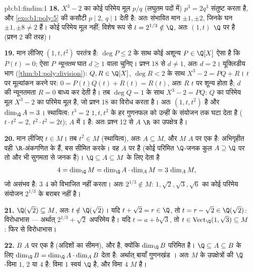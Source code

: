 \begin{solution}{pb:b1:findim:1}
\textbf{18.} $X^3 - 2$ का कोई परिमेय मूल $p/q$ (लघुतम पदों में) $p^3 = 2q^3$
संतुष्ट करता है, और \cref{exo:b1:poly:5} की कसौटी $p \mid 2$, $q \mid 1$
देती है: अतः संभावित मान $\pm1, \pm2$, जिनके घन $\pm1, \pm8 \neq 2$ हैं। कोई
परिमेय मूल नहीं; विशेष रूप से $t = 2^{1/3} \notin \Q$, अतः $(1, t)$ $\Q$ पर
 है (प्रश्न 2 की तरह)।

\textbf{19.} मान लीजिए $(1, t, t^2)$ परतंत्र है: $\deg P \leq 2$ के साथ कोई
अशून्य $P \in \Q[X]$ ऐसा है कि $P(t) = 0$; ऐसा $P$ \emph{न्यूनतम} घात $d
\geq 1$ वाला चुनिए। प्रश्न 18 से $d \neq 1$, अतः $d = 2$। यूक्लिडीय भाग
(\cref{thm:b1:poly:division}): $Q, R \in \Q[X]$, $\deg R < 2$ के साथ $X^3 -
2 = PQ + R$। $t$ पर मूल्यांकन करने पर: $0 = P(t)Q(t) + R(t) = R(t)$, अतः $R$
$t$ पर शून्य होता है; $d$ की न्यूनतमता $R = 0$ बाध्य कर देती है। तब $\deg Q
= 1$ के साथ $X^3 - 2 = PQ$: $Q$ का परिमेय मूल $X^3 - 2$ का परिमेय मूल है, जो
प्रश्न 18 का विरोध करता है। अतः $(1, t, t^2)$  है और $\dim_\Q A =
3$। स्थायित्व: $t^3 = 2$ $1, t, t^2$ के हर गुणनफल को उन्हीं के संयोजन तक घटा
देता है ($t\cdot t^2 = 2$, $t^2\cdot t^2 = 2t$); $A$ में $1$ है: अतः प्रश्न
12 से $A$ $\R$ का उपक्षेत्र है।

\textbf{20.} मान लीजिए $t \in M$। तब $t^2 \in M$ (स्थायित्व), अतः $A
\subseteq M$, और $M$  $A$ पर एक  है: अभिगृहीत वही
$\R$-अंकगणित के हैं, बस सीमित करके। वह $A$ पर  है (कोई परिमित
$\Q$-जनक कुल $A \supseteq \Q$ पर तो और भी सुगमता से जनक है)। $\Q \subseteq A
\subseteq M$ के लिए  देता है
\[
4 = \dim_\Q M = \dim_\Q A \cdot \dim_A M = 3\,\dim_A M ,
\]
जो असंभव है: $3$ $4$ को विभाजित नहीं करता। अतः $2^{1/3} \notin M$: $1,
\sqrt2, \sqrt3, \sqrt6$ का कोई परिमेय संयोजन $2^{1/3}$ के बराबर नहीं है।

\textbf{21.} $\Q(\sqrt2) \subseteq M$, अतः $t \notin \Q(\sqrt2)$। यदि $t +
\sqrt2 = r \in \Q$, तो $t = r - \sqrt2 \in \Q(\sqrt2)$: विरोधाभास ---
अर्थात् $2^{1/3} + \sqrt2$ अपरिमेय है। यदि $t = a + b\sqrt3$, तो $t \in
\operatorname{Vect}_\Q(1, \sqrt3) \subseteq M$: फिर से विरोधाभास।

\textbf{22.} $B$  $A$ पर एक  है (अदिशों का सीमन), और
 है, क्योंकि $\dim_\Q B$ परिमित है। $\Q \subseteq A \subseteq B$
के लिए  $\dim_\Q B = \dim_\Q A \cdot \dim_A B$ देता है: अर्थात्
बायाँ गुणनखंड । अतः $M$ के उपक्षेत्रों की $\Q$-विमा $1$, $2$
या $4$ है: विमा $1$ स्वयं $\Q$ है, और विमा $4$ $M$ है।


\end{solution}
